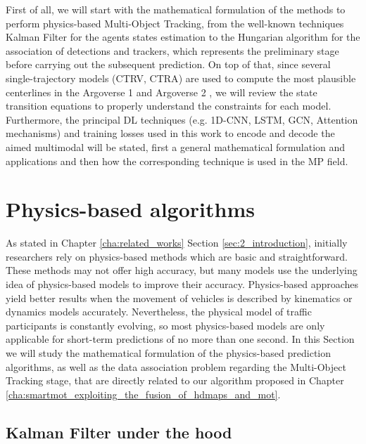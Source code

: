 First of all, we will start with the mathematical formulation of the methods to perform physics-based Multi-Object Tracking, from the well-known techniques Kalman Filter \cite{kalman1960new} for the agents states estimation to the Hungarian algorithm \cite{kuhn1955hungarian} for the association of detections and trackers, which represents the preliminary stage before carrying out the subsequent prediction. On top of that, since several single-trajectory models (\ac{CTRV}, \ac{CTRA}) are used to compute the most plausible centerlines in the Argoverse 1 \cite{chang2019argoverse} and Argoverse 2 \cite{wilson2023argoverse}, we will review the state transition equations to properly understand the constraints for each model. Furthermore, the principal \ac{DL} techniques (e.g. 1D-CNN, LSTM, GCN, Attention mechanisms) and training losses used in this work to encode and decode the aimed multimodal will be stated, first a general mathematical formulation and applications and then how the corresponding technique is used in the \ac{MP} field.

\section{Physics-based algorithms}
\label{sec:3_pb_formulation}


As stated in Chapter \ref{cha:related_works} Section \ref{sec:2_introduction}, initially researchers rely on physics-based methods which are basic and straightforward. These methods may not offer high accuracy, but many models use the underlying idea of physics-based models to improve their accuracy. Physics-based approaches yield better results when the movement of vehicles is described by kinematics or dynamics models accurately. Nevertheless, the physical model of traffic participants is constantly evolving, so most physics-based models are only applicable for short-term predictions of no more than one second. In this Section we will study the mathematical formulation of the physics-based prediction algorithms, as well as the data association problem regarding the Multi-Object Tracking stage, that are directly related to our algorithm proposed in Chapter \ref{cha:smartmot_exploiting_the_fusion_of_hdmaps_and_mot}.

\subsection{Kalman Filter under the hood}
\label{subsec:3_kf_formulation}

